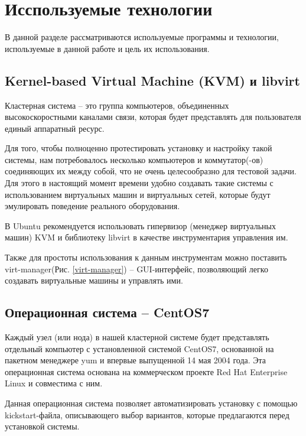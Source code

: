 \chapter{Исспользуемые технологии}\label{technologies}

В данной разделе рассматриваются используемые программы и технологии,
используемые в данной работе и цель их использования.

\section{Kernel-based Virtual Machine (KVM) и libvirt}

Кластерная система -- это группа компьютеров, объединенных высокоскоростными
каналами связи, которая будет представлять для пользователя единый аппаратный
ресурс.

Для того, чтобы полноценно протестировать установку и настройку такой системы,
нам потребовалось несколько компьютеров и коммутатор(-ов) соединяющих их между
собой, что не очень целесообразно для тестовой задачи. Для этого в настоящий
момент времени удобно создавать такие системы с использованием виртуальных
машин и виртуальных сетей, которые будут эмулировать поведение реального
оборудования.

В Ubuntu рекомендуется использовать гипервизор (менеджер виртуальных машин)
\textmd{KVM}\cite{kvm} и библиотеку \textmd{libvirt}\cite{libvirt} в качестве инструментария
управления им.


Также для простоты использования к данным инструментам можно поставить
\textmd{virt-manager}(Рис. \ref{virt-manager}) -- GUI-интерфейс, позволяющий
легко создавать виртуальные машины и управлять ими.

\section{Операционная система -- CentOS7}

Каждый узел (или нода) в нашей кластерной системе будет представлять
отдельный компьютер с установленной системой \textmd{CentOS7}\cite{centos},
основанной на пакетном менеджере \textmd{yum} и впервые выпущенной 14 мая 2004 года.
Эта операционная система основана на коммерческом проекте
\textmd{Red Hat Enterprise Linux}\cite{rhel} и совместима с ним.

Данная операционная система позволяет автоматизировать установку с помощью
\textmd{kickstart}-файла\cite{rhel-kickstart}, описывающего выбор вариантов,
которые предлагаются перед установкой системы.

